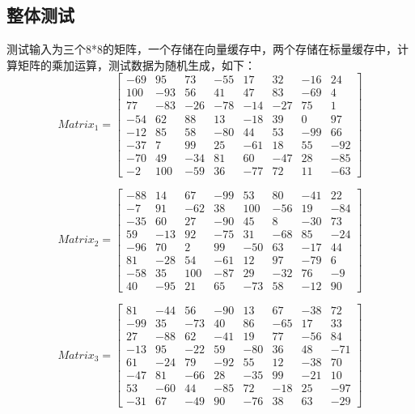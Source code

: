 \documentclass[UTF8]{ctexart}
\begin{document}
\subsection{整体测试}
测试输入为三个8*8的矩阵，一个存储在向量缓存中，两个存储在标量缓存中，计算矩阵的乘加运算，测试数据为随机生成，如下：
\begin{equation}
Matrix_1
=
\left[
\begin{array}{cccccccc}
    -69 & 95  & 73  & -55 & 17  & 32  & -16 & 24  \\
    100 & -93 & 56  & 41  & 47  & 83  & -69 & 4   \\
    77  & -83 & -26 & -78 & -14 & -27 & 75  & 1   \\
    -54 & 62  & 88  & 13  & -18 & 39  & 0   & 97  \\
    -12 & 85  & 58  & -80 & 44  & 53  & -99 & 66  \\
    -37 & 7   & 99  & 25  & -61 & 18  & 55  & -92 \\
    -70 & 49  & -34 & 81  & 60  & -47 & 28  & -85 \\
    -2  & 100 & -59 & 36  & -77 & 72  & 11  & -63 
\end{array}
\right]
\end{equation}

\begin{equation}
Matrix_2
=
\left[
\begin{array}{cccccccc}
    -88 & 14  & 67  & -99 & 53  & 80  & -41 & 22  \\
    -7  & 91  & -62 & 38  & 100 & -56 & 19  & -84 \\
    -35 & 60  & 27  & -90 & 45  & 8   & -30 & 73  \\
    59  & -13 & 92  & -75 & 31  & -68 & 85  & -24 \\
    -96 & 70  & 2   & 99  & -50 & 63  & -17 & 44  \\
    81  & -28 & 54  & -61 & 12  & 97  & -79 & 6   \\
    -58 & 35  & 100 & -87 & 29  & -32 & 76  & -9  \\
    40  & -95 & 21  & 65  & -73 & 58  & -12 & 90
\end{array}
\right]
\end{equation}

\begin{equation}
Matrix_3
=
\left[
\begin{array}{cccccccc}
    81 & -44 & 56 & -90 &  13 & 67 & -38 &  72\\
   -99 &  35 &-73 &  40 &  86 &-65 &  17 &  33\\
    27 & -88 & 62 & -41 &  19 & 77 & -56 &  84\\
   -13 &  95 &-22 &  59 & -80 & 36 &  48 & -71\\
    61 & -24 & 79 & -92 &  55 & 12 & -38 &  70\\
   -47 &  81 &-66 &  28 & -35 & 99 & -21 &  10\\
    53 & -60 & 44 & -85 &  72 &-18 &  25 & -97\\
   -31 &  67 &-49 &  90 & -76 & 38 &  63 & -29
\end{array}
\right]
\end{equation}
\end{document}
